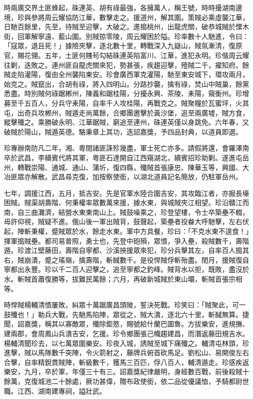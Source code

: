 \begin{pinyinscope}
時兩廣交界土匪蜂起，硃連英、胡有祿最強，各擁萬人，稱王號，時時擾湖南邊境，珍與參將周云耀協防江華，數擊走之。援道州，解其圍。策賊必乘虛襲江華，日馳百餘里，先至，待賊至迎擊，大破之。進搗桃州，出龍虎關，破恭城賊於慄木街，回軍解寧遠、藍山圍。別賊掠零陵，周云耀困於隘。珍率數十人馳進，令曰：「寇眾，退且死！」據險夾擊，逐北數十里，轉戰深入九嶷山，賊氛漸清，復原官，賜花翎。五年，土匪何賤茍勾結硃連英陷富川、江華，進犯永明。珍偕周云耀往剿，迭敗之。連州匪自龍虎關來犯，勢甚張，疾趨迎擊，殪賊二千，擢知府。餘賊走陷灌陽，復由全州襲陷東安。珍會廣西軍克灌陽，馳至東安城下，環攻兩月，始克之。賊竄出，合胡有祿，將入四明山。分路抄襲，擒有祿，焚山中賊巢，餘黨悉盡。時別賊何祿踞郴州，陳義和踞桂陽，分擾永興、茶陵、耒陽，窺衡州。珍增募至千五百人，分兵守耒陽，自率千人攻桂陽，再戰克之。賊聚糧於瓦蜜坪，火其屯，出奇兵攻郴州，賊遁走尚萬餘，合鄉團邀擊於黃沙堡，追至兩廣墟，賊方食，縱擊殲之。乘勝破永明、江華踞賊，窮追至連州，硃連英僅以身跳免。六年春，又破賊於陽山，賊遁英德。駱秉章上其功，迭詔嘉獎，予四品封典，以道員即選。

珍專辦南防凡二年，湘、粵間諸匪誅殄幾盡，軍士死亡亦多。請假將還，會羅澤南卒於武昌，李續賓代將其軍，粵匪石達開自江西窺湖北，續賓招珍助剿。遂進屯岳州，轉戰崇陽、通城、通山、蒲圻，復四縣，殲賊首張康忠、陳華玉等，興國、大冶匪眾亦解散。武昌尋克復，加按察使銜，以湖北道員記名簡放，仍駐軍岳州。

七年，調援江西，五月，抵吉安。先是官軍水陸合圍吉安，其攻臨江者，亦掘長壕困賊。賊渠胡壽階、何秉權率眾數萬來援，據水東，與城賊夾江相望。珍沿贛江而南，自三曲灘濟，結營水東東南山上。賊鼓噪乘之，珍登望樓，令士卒築壘不輟，毋許仰視，賊疑不進。俄山後一軍出賊背，鼓聲起，築壘者投畚大呼馳擊，左右伏起，陣斬秉權，蹙賊眾於水，餘走水東。軍中方具餐，珍曰：「不克水東不遑食！」揮軍搗賊壘。都司易普照，勇士也，先登中砲殞，眾憤，爭入壘，殺賊數千，壽階遁。珍渡江壁藤田，壽階自寧都、沙溪挾援眾來犯，珍分兵擊其左，自率百人搗其右，賊崩潰，蹙之瑤嶺，擒壽階，斬馘數千。是役悍賊俘斬殆盡。閏月，援賊復自寧都出永豐。珍以千二百人迎擊之，追至寧都之釣峰。賊背水以拒，既敗，盡沒於水。斬賊首蕭復勝等，拔難民萬餘；六月，再破新城賊於東山壩，斬賊首張宗相等。

時悍賊楊輔清憤屢敗，糾眾十萬踞廣昌頭陂，誓決死戰。珍笑曰：「賊聚此，可一鼓殲也！」勒兵大戰，先馳馬陷陣，眾從之，賊大潰，逐北六十里，斬馘無算。捷聞，詔嘉獎，稱其以寡敵眾，殲除鉅憝，賜號給什蘭巴圖魯。方拔樂安，進規撫、建兩郡，會周鳳山兵潰吉安，乞援。珍令鄉團張己幟趨建昌，而潛返藤田規吉水。楊輔清聞珍去，以七萬眾圍樂安。珍夜入城，誘賊至城下痛殲之。輔清屯林頭，珍進擊，賊以馬隊數千突陣，令火箭射之，藤牌兵俯首砍馬足。劉松山、易開俊左右合擊，自率精銳貫賊陣，斬級數千，獲馬三百匹，俘八百人，輔清遁走。珍感疾返樂安，九月，卒於軍，年僅三十有三。詔嘉獎紀律嚴明，身經數百戰，前後殺賊十餘萬，克復城池二十餘處，厥功甚偉，贈布政使銜，依二品從優議恤，予騎都尉世職。江西、湖南建專祠，謚壯武。


\end{pinyinscope}
